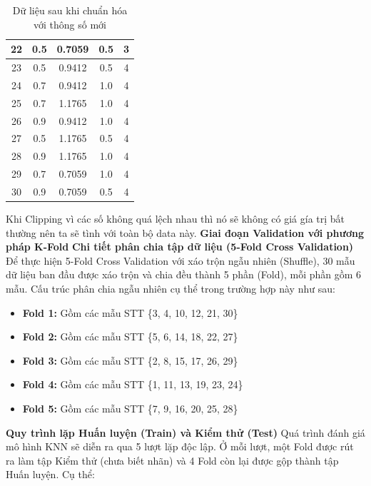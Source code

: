 \documentclass[12pt,a4paper]{article}
\begin{document}
\begin{table}[h]
\begin{tabular}{|c|c|c|c|c|}
22 & 0.5  & 0.7059  & 0.5  & 3 \\ \hline
23 & 0.5  & 0.9412  & 0.5  & 4 \\ \hline
24 & 0.7  & 0.9412  & 1.0  & 4 \\ \hline
25 & 0.7  & 1.1765  & 1.0  & 4 \\ \hline
26 & 0.9  & 0.9412  & 1.0  & 4 \\ \hline
27 & 0.5  & 1.1765  & 0.5  & 4 \\ \hline
28 & 0.9  & 1.1765  & 1.0  & 4 \\ \hline
29 & 0.7  & 0.7059  & 1.0  & 4 \\ \hline
30 & 0.9  & 0.7059  & 0.5  & 4 \\ \hline
\end{tabular}
\caption{Dữ liệu sau khi chuẩn hóa với thông số mới}
\end{table}
\newpage
Khi Clipping vì các số không quá lệch nhau thì nó sẽ không có giá gía trị bất thường nên ta sẽ tình với toàn bộ data này.
\newline
\textbf{Giai đoạn Validation với phương pháp K-Fold} 
\textbf{Chi tiết phân chia tập dữ liệu (5-Fold Cross Validation)}
Để thực hiện 5-Fold Cross Validation với xáo trộn ngẫu nhiên (Shuffle), 30 mẫu dữ liệu ban đầu được xáo trộn và chia đều thành 5 phần (Fold), mỗi phần gồm 6 mẫu. Cấu trúc phân chia ngẫu nhiên cụ thể trong trường hợp này như sau:

\begin{itemize}
    \item \textbf{Fold 1:} Gồm các mẫu STT \{3, 4, 10, 12, 21, 30\}
    \item \textbf{Fold 2:} Gồm các mẫu STT \{5, 6, 14, 18, 22, 27\}
    \item \textbf{Fold 3:} Gồm các mẫu STT \{2, 8, 15, 17, 26, 29\}
    \item \textbf{Fold 4:} Gồm các mẫu STT \{1, 11, 13, 19, 23, 24\}
    \item \textbf{Fold 5:} Gồm các mẫu STT \{7, 9, 16, 20, 25, 28\}
\end{itemize}

\textbf{Quy trình lặp Huấn luyện (Train) và Kiểm thử (Test)}
Quá trình đánh giá mô hình KNN sẽ diễn ra qua 5 lượt lặp độc lập. Ở mỗi lượt, một Fold được rút ra làm tập Kiểm thử (chưa biết nhãn) và 4 Fold còn lại được gộp thành tập Huấn luyện. Cụ thể:
\end{document}
